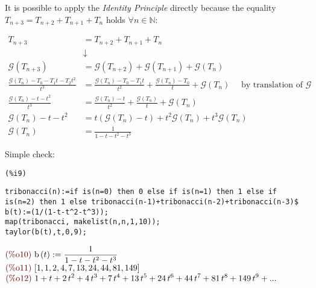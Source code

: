 It is possible to apply the \emph{Identity Principle} directly because
the equality $T_{n+3} = T_{n+2} + T_{n+1} + T_{n}$ holds $\forall n
\in \mathbb{N} $:

\begin{displaymath}
  \begin{split}
    T_{n+3} &=T_{n+2}+ T_{n+1} + T_{n}  \\
    &\downarrow \\
    \mathcal{G} (T_{n+3}) &= \mathcal{G} (T_{n+2}) + \mathcal{G}
    (T_{n+1}) + \mathcal{G}
    (T_{n}) \\
    \frac{\mathcal{G} (T_n) - T_0 - T_1 t - T_2t^2}{t^3} &=
    \frac{\mathcal{G} (T_n) - T_0 - T_1 t}{t^2} + \frac{\mathcal{G}
      (T_n) - T_0}{t} + \mathcal{G}
    (T_{n}) \quad \text{ by translation of } \mathcal{G} \\
    \frac{\mathcal{G} (T_n) - t - t^2}{t^3} &= \frac{\mathcal{G} (T_n)
      - t}{t^2} + \frac{\mathcal{G} (T_n) }{t} + \mathcal{G}
    (T_{n})\\
    \mathcal{G} (T_n) - t - t^2 &= t(\mathcal{G} (T_n) - t) +
    t^2\mathcal{G} (T_n) + t^3\mathcal{G}
    (T_{n})\\
    \mathcal{G} (T_n) &= \frac{1}{1-t-t^2-t^3
}
  \end{split}
\end{displaymath}

Simple check:


\noindent
\begin{minipage}[t]{8ex}{\color{red}\bf
\begin{verbatim}
(%i9) 
\end{verbatim}}
\end{minipage}
\begin{minipage}[t]{\textwidth}{\color{blue}
\begin{verbatim}
tribonacci(n):=if is(n=0) then 0 else if is(n=1) then 1 else if
is(n=2) then 1 else tribonacci(n-1)+tribonacci(n-2)+tribonacci(n-3)$
b(t):=(1/(1-t-t^2-t^3));
map(tribonacci, makelist(n,n,1,10));
taylor(b(t),t,0,9);
\end{verbatim}}
\end{minipage}
\begin{math}\displaystyle
\parbox{8ex}{\color{labelcolor}(\%o10) }
\mathrm{b}\left( t\right) :=\frac{1}{1-t-{t}^{2}-{t}^{3}}
\end{math}\\
\begin{math}\displaystyle
\parbox{8ex}{\color{labelcolor}(\%o11) }
[1,1,2,4,7,13,24,44,81,149]
\end{math}\\
\begin{math}\displaystyle
\parbox{8ex}{\color{labelcolor}(\%o12) }
1+t+2\,{t}^{2}+4\,{t}^{3}+7\,{t}^{4}+13\,{t}^{5}+24\,{t}^{6}+44\,{t}^{7}+81\,{t}^{8}+149\,{t}^{9}+...
\end{math}

